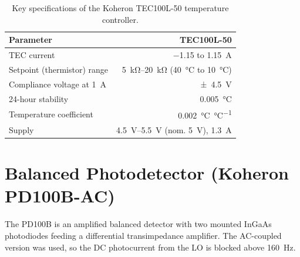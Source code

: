 \begin{table}[H]
	\centering
	\begin{tabular}{@{}lr@{}}
		\toprule
		\textbf{Parameter} & \textbf{TEC100L-50} \\
		\midrule
		TEC current                       & \SI{-1.15}{} to \SI{1.15}{\ampere} \\
		Setpoint (thermistor) range       & \SIrange{5}{20}{\kilo\ohm} (\SI{40}{\celsius} to \SI{10}{\celsius}) \\
		Compliance voltage at \SI{1}{\ampere} & \SI{\pm 4.5}{\volt} \\
		24-hour stability                 & \SI{0.005}{\celsius} \\
		Temperature coefficient           & \SI{0.002}{\celsius\per\celsius} \\
		Supply                            & \SIrange{4.5}{5.5}{\volt} (nom. \SI{5}{\volt}), \SI{1.3}{\ampere} \\
		\bottomrule
	\end{tabular}
	\caption{Key specifications of the Koheron TEC100L-50 temperature controller.}
	\label{tab:tec100l-full}
\end{table}


\section{Balanced Photodetector (Koheron PD100B-AC)}
\label{appendix:pd100b}
The PD100B is an amplified balanced detector with two mounted InGaAs photodiodes feeding a differential transimpedance amplifier. The AC-coupled version was used, so the DC photocurrent from the LO is blocked above \SI{160}{\hertz}.

